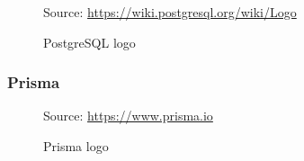 \begin{figure} %
  \centering
  \def\stackalignment{r} %
  {\scriptsize \parbox[t]{\linewidth}{ Source: \url{https://wiki.postgresql.org/wiki/Logo}} }
  \caption{PostgreSQL logo}
\end{figure}

\subsubsection{Prisma}
\label{subsubsec:implementation_server_database_prisma}

\begin{figure} %
  \centering
  \def\stackalignment{r} %
  {\scriptsize \parbox[t]{\linewidth}{ Source: \url{https://www.prisma.io}} }
  \caption{Prisma logo}
\end{figure}

